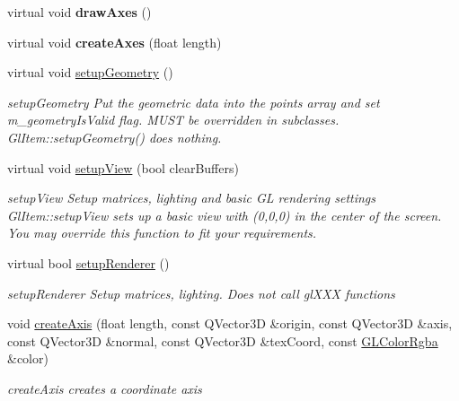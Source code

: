 \begin{DoxyCompactItemize}
\mbox{\label{class_g_l_item_aef70de1482fa71495a178626566f4f3a}} 
virtual void {\bfseries draw\+Axes} ()
\item 
\mbox{\label{class_g_l_item_acbf456bdbaf38bc941029bddab6a69a9}} 
virtual void {\bfseries create\+Axes} (float length)
\item 
\mbox{\label{class_g_l_item_a74269f515d4d025149cc8a603d8c66f1}} 
virtual void \mbox{\hyperlink{class_g_l_item_a74269f515d4d025149cc8a603d8c66f1}{setup\+Geometry}} ()
\begin{DoxyCompactList}\small\item\em setup\+Geometry Put the geometric data into the points array and set m\+\_\+geometry\+Is\+Valid flag. M\+U\+ST be overridden in subclasses. Gl\+Item\+::setup\+Geometry() does nothing. \end{DoxyCompactList}\item 
\mbox{\label{class_g_l_item_a3b5a6427cdafb5adb6aeef1c644bb933}} 
virtual void \mbox{\hyperlink{class_g_l_item_a3b5a6427cdafb5adb6aeef1c644bb933}{setup\+View}} (bool clear\+Buffers)
\begin{DoxyCompactList}\small\item\em setup\+View Setup matrices, lighting and basic GL rendering settings Gl\+Item\+::setup\+View sets up a basic view with (0,0,0) in the center of the screen. You may override this function to fit your requirements. \end{DoxyCompactList}\item 
\mbox{\label{class_g_l_item_a026f429130712bff4517c1cf9af910fd}} 
virtual bool \mbox{\hyperlink{class_g_l_item_a026f429130712bff4517c1cf9af910fd}{setup\+Renderer}} ()
\begin{DoxyCompactList}\small\item\em setup\+Renderer Setup matrices, lighting. Does not call gl\+X\+XX functions \end{DoxyCompactList}\item 
void \mbox{\hyperlink{class_g_l_item_a2153cac833846fcd3b8b507bff244406}{create\+Axis}} (float length, const Q\+Vector3D \&origin, const Q\+Vector3D \&axis, const Q\+Vector3D \&normal, const Q\+Vector3D \&tex\+Coord, const \mbox{\hyperlink{class_g_l_color_rgba}{G\+L\+Color\+Rgba}} \&color)
\begin{DoxyCompactList}\small\item\em create\+Axis creates a coordinate axis \end{DoxyCompactList}\item 

\end{DoxyCompactItemize}
